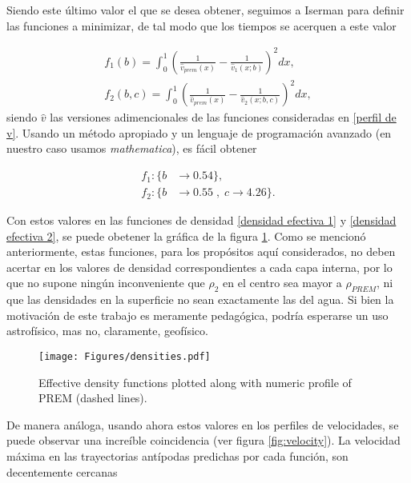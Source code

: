 \documentclass[aps,twocolumn,showpacs,preprintnumbers]{revtex4}
\begin{document}
        Siendo este último valor el que se desea obtener, seguimos a Iserman\citep{gravity-train-prem-approx} para definir las funciones a minimizar, de tal modo que los tiempos se acerquen a este valor
        
        \begin{align}
            f_1(b)=\int_0^1 \left( \frac{1}{\hat{v}_{prem}(x)}-\frac{1}{\hat{v}_1(x;b)} \right)^2 dx \label{f1 minimize}, \\
            f_2(b,c)=\int_0^1 \left( \frac{1}{\hat{v}_{prem}(x)}-\frac{1}{\hat{v}_2(x;b,c)} \right)^2 dx \label{f1 minimize},
        \end{align}
        siendo $\hat{v}$ las versiones adimencionales de las funciones consideradas en \eqref{perfil de v}. Usando un método apropiado y un lenguaje de programación avanzado (en nuestro caso usamos \emph{mathematica}), es fácil obtener
        
        \begin{align*}
            f_1: \{ b &\rightarrow 0.54 \} ,\\
            f_2: \{ b &\rightarrow 0.55 \; ,\; c \rightarrow 4.26 \}.
        \end{align*}
        
    Con estos valores en las funciones de densidad \eqref{densidad efectiva 1} y \eqref{densidad efectiva 2}, se puede obetener la gráfica de la figura \ref{fig:density}. Como se mencionó anteriormente, estas funciones, para los propósitos aquí considerados, no deben acertar en los valores de densidad correspondientes a cada capa interna, por lo que no supone ningún inconveniente que $\rho_2$ en el centro sea mayor a $\rho_{PREM}$, ni que las densidades en la superficie no sean exactamente las del agua. Si bien la motivación de este trabajo es meramente pedagógica, podría esperarse un uso astrofísico, mas no, claramente, geofísico.
    
    \begin{figure}
        \centering
        \texttt{[image: Figures/densities.pdf]}
        \caption{Effective density functions plotted along with numeric profile of PREM (dashed lines).}
        \label{fig:density}
    \end{figure}
    
    
    De manera análoga, usando ahora estos valores en los perfiles de velocidades, se puede observar una increíble coincidencia (ver figura  \ref{fig:velocity}). La velocidad máxima en las trayectorias antípodas predichas por cada función, son decentemente cercanas
    
\end{document}
